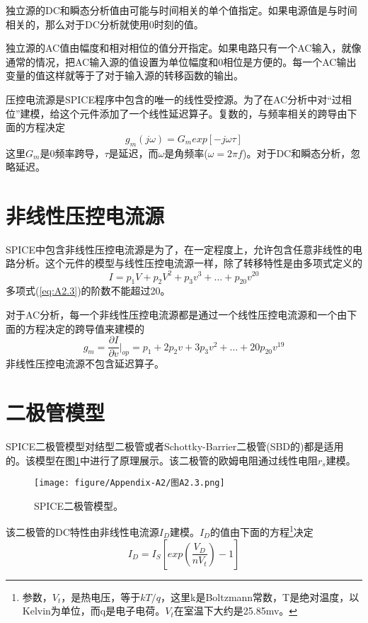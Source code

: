 独立源的DC和瞬态分析值由可能与时间相关的单个值指定。如果电源值是与时间相关的，那么对于DC分析就使用0时刻的值。

独立源的AC值由幅度和相对相位的值分开指定。如果电路只有一个AC输入，就像通常的情况，把AC输入源的值设置为单位幅度和0相位是方便的。每一个AC输出变量的值这样就等于了对于输入源的转移函数的输出。

压控电流源是SPICE程序中包含的唯一的线性受控源。为了在AC分析中对“过相位”建模，给这个元件添加了一个线性延迟算子。复数的，与频率相关的跨导由下面的方程决定
\begin{equation}
    g_m(j\omega) =G_m exp[-j\omega \tau]
    \label{eq:A2.2}
\end{equation}
这里$G_m$是0频率跨导，$\tau$是延迟，而$\omega$是角频率($\omega = 2\pi f$)。对于DC和瞬态分析，忽略延迟。

\section{非线性压控电流源}
SPICE中包含非线性压控电流源是为了，在一定程度上，允许包含任意非线性的电路分析。这个元件的模型与线性压控电流源一样，除了转移特性是由多项式定义的
\begin{equation}
    I = p_1V+p_2V^2+p_3v^3+\dots+p_{20}v^{20}
    \label{eq:A2.3}
\end{equation}
多项式(\ref{eq:A2.3})的阶数不能超过20。

对于AC分析，每一个非线性压控电流源都是通过一个线性压控电流源和一个由下面的方程决定的跨导值来建模的
\begin{equation}
    g_m = \frac{\partial I}{\partial v}|_{op} = p_1 + 2p_2v + 3p_3v^2 + \dots + 20p_{20}v^{19}
\end{equation}
非线性压控电流源不包含延迟算子。

\section{二极管模型}
SPICE二极管模型对结型二极管或者Schottky-Barrier二极管(SBD的)都是适用的。该模型在图\ref{图A2.3}中进行了原理展示。该二极管的欧姆电阻通过线性电阻$r_s$建模。

\begin{figure}[htbp]
\small
    \centering
    \texttt{[image: figure/Appendix-A2/图A2.3.png]}
    \caption{SPICE二极管模型。}
    \label{图A2.3}
\end{figure}

该二极管的DC特性由非线性电流源$I_D$建模。$I_D$的值由下面的方程\footnote{参数，$V_t$，是热电压，等于$kT/q$，这里k是Boltzmann常数，T是绝对温度，以Kelvin为单位，而q是电子电荷。$V_t$在室温下大约是25.85mv。}决定
\begin{equation}
    I_D = I_S[exp(\frac{V_D}{nV_t})-1]
    \label{eq:A2.5}
\end{equation}

